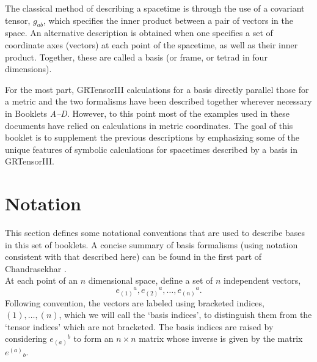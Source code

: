 \documentclass{article}
\begin{document}
\grlabel{\grBasisLabel}
\grtitle{\grBasisTitle}
\grtitlepage
\copyrightpage
\noindent The classical method of describing a spacetime is through
the use of a covariant tensor, $g_{ab}$, which specifies the inner
product between a pair of vectors in the space. An alternative
description is obtained when one specifies a set of coordinate axes
(vectors) at each point of the spacetime, as well as their inner
product. Together, these are called a basis (or frame, or tetrad in
four dimensions).

For the most part, GRTensorIII calculations for a basis directly
parallel those for a metric and the two formalisms have been described
together wherever necessary in Booklets \textsl{A--D}. However, to
this point most of the examples used in these documents
have relied on calculations in metric coordinates. The goal
of this booklet is to supplement the previous descriptions by
emphasizing some of the unique features of symbolic calculations for
spacetimes described by a basis in GRTensorIII.
%
\section{Notation}
%
This section defines some notational conventions that are used to
describe bases in this set of booklets. A concise summary of basis
formalisms (using notation consistent with that described here) can be
found in the first part of Chandrasekhar \cite{chandrasekhar:1983}.\\

At each point of an $n$ dimensional space, define a set of $n$
independent vectors,
\[
  e_{(1)}{}^a, e_{(2)}{}^a, \ldots, e_{(n)}{}{}^a.  
\]
Following convention, the vectors are labeled using bracketed
indices, $(1), \ldots, (n)$, which we will call the `basis indices',
to distinguish them from the `tensor indices' which are not bracketed.
The basis indices are raised by considering $e_{(a)}{}^b$ to form an
$n\times n$ matrix whose inverse is given by the matrix $e^{(a)}{}_b$.
\end{document}
